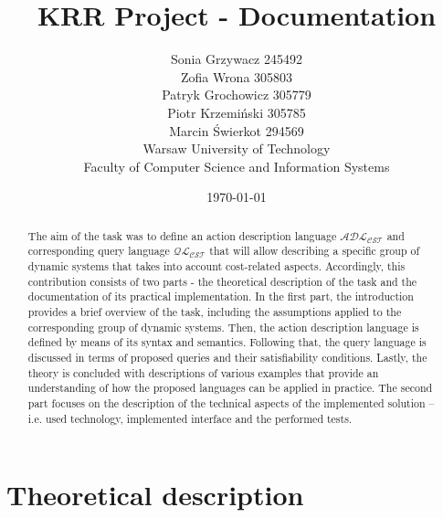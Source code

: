 \documentclass[a4paper]{article}
\begin{document}
\title{
KRR Project - Documentation {\large\linebreak\\}}
\author{
Sonia Grzywacz 245492\\[0.1cm]
Zofia Wrona 305803 \\[0.1cm]
Patryk Grochowicz 305779 \\[0.1cm]
Piotr Krzemiński 305785\\[0.1cm]
Marcin Świerkot 294569 \\[0.5cm]
Warsaw University of Technology\\
Faculty of Computer Science and Information Systems\\
}
\date{\today}
\maketitle

\begin{abstract}
The aim of the task was to define an action description language $\mathcal{ADL_{CST}}$ and corresponding query language $\mathcal{QL_{CST}}$ that will allow describing a specific group of dynamic systems that takes into account cost-related aspects. Accordingly, this contribution consists of two parts - the theoretical description of the task and the documentation of its practical implementation. In the first part, the introduction provides a brief overview of the task, including the assumptions applied to the corresponding group of dynamic systems. Then, the action description language is defined by means of its syntax and semantics. Following that, the query language is discussed in terms of proposed queries and their satisfiability conditions. Lastly, the theory is concluded with descriptions of various examples that provide an understanding of how the proposed languages can be applied in practice. The second part focuses on the description of the technical aspects of the implemented solution -- i.e. used technology, implemented interface and the performed tests. 
\end{abstract}

\tableofcontents\label{c}
\newpage

\section{Theoretical description}
\end{document}
